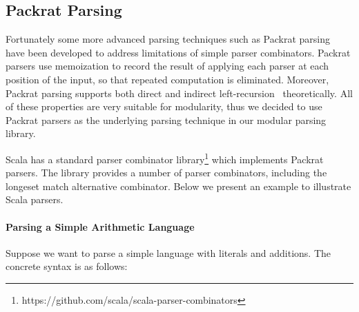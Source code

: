 \subsection{Packrat Parsing}\label{subsec:packratparsing}
Fortunately some more advanced parsing techniques such as Packrat parsing~\cite{Ford2002} have been developed to address limitations of simple parser combinators. Packrat parsers use memoization to record the result of applying each parser at each position of the input, so that repeated computation is eliminated. Moreover, Packrat parsing supports both direct and indirect left-recursion~\cite{warth2008} theoretically. All of these properties are very suitable for modularity, thus we decided to use Packrat parsers as the underlying parsing technique in our modular parsing library.
\begin{comment}
It is worth mentioning that the choice of parser combinators will not
affect the other parts of our library. One can choose other parser
combinators like Parsec, in cases that the performance and supporting
of left-recursion are not major concerns. A different library can even build a new
\name with fancy features or higher efficiency.
\end{comment}
Scala has a standard parser combinator library\footnote{https://github.com/scala/scala-parser-combinators}
\cite{moors2008parser} which implements Packrat parsers.
The library provides a number of parser combinators, including the longeset match alternative combinator.
Below we present an example to illustrate Scala parsers.
%

\paragraph{Parsing a Simple Arithmetic Language}
Suppose we want to parse a simple language with literals and
additions. The concrete syntax is as follows:

